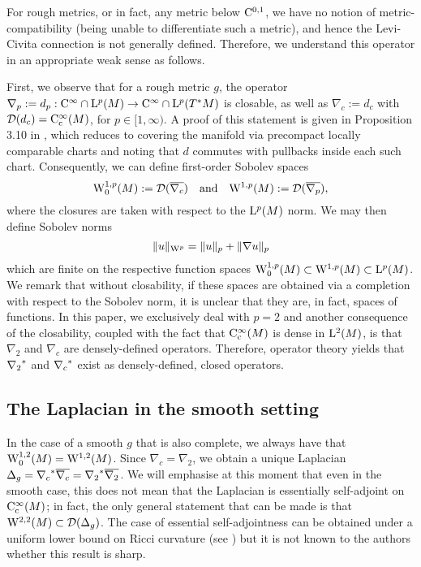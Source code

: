 \documentclass[a4paper, 12pt]{amsart}
\begin{document}
For rough metrics, or in fact, any metric below $\Ck{0,1}$, we have no notion of metric-compatibility (being unable to differentiate such a metric), and hence the Levi-Civita connection is not generally defined. Therefore, we understand this operator in an appropriate weak sense as follows. 

First, we observe that for a rough metric $g$, the operator
$\nabla_p := d_p: \Ck{\infty} \cap \Lp{p}(M) \to \Ck{\infty} \cap \Lp{p}(T^\ast M)$
is closable, as well as $\nabla_c := d_c$ with $\dom(d_c) = \Ck[c]{\infty}(M)$,
for $p \in [1, \infty)$. A proof of this statement is given in Proposition 3.10 in \cite{BRough}, 
which reduces to covering the manifold via precompact locally comparable
charts and noting that $d$ commutes with pullbacks inside each such chart.
Consequently, we can define first-order Sobolev spaces
\[
\Sob[0]{1,p}(M) := \dom(\overline{\nabla_c})\quad \text{and}\quad  \Sob{1,p}(M) := \dom(\overline{\nabla_p}),
\]
where the closures are taken with respect to the \(\Lp{p}(M)\) norm. We may then define Sobolev norms
\[
\|u\|_{\Sob{p}} = \|u\|_p + \|\nabla u\|_p
\]
which are finite on the respective function spaces $\Sob[0]{1,p}(M) \subset \Sob{1,p}(M) \subset \Lp{p}(M)$. We remark that without closability, if these spaces are obtained via a completion with respect to the Sobolev norm, it is unclear that they are, in fact, spaces of functions. In this paper, we exclusively deal with \(p = 2\) and another consequence of the closability, coupled with the 
fact that $\Ck[c]{\infty}(M)$ is dense in $\Lp{2}(M)$,
is that $\nabla_2$ and $\nabla_c$ are densely-defined
operators. Therefore, operator theory yields 
that $\adj{\nabla_2}$ and $\adj{\nabla_c}$ exist
as densely-defined, closed operators.

\subsection{The Laplacian in the smooth setting}

In the case of a smooth $g$ that is also complete, we
always have that $\SobH[0]{1}(M) = \SobH{1}(M)$. 
Since $\nabla_c = \nabla_2$, we obtain 
a unique Laplacian $\Delta_g = \adj{\nabla_c} \close{\nabla_c} = \adj{\nabla_2}\close{\nabla_2}$.
We will emphasise at this moment that even in the smooth case, this does not mean that the Laplacian is essentially self-adjoint on $\Ck[c]{\infty}(M)$; in fact, the only general statement that can be made is that
$\SobH{2}(M) \subset \dom(\Delta_g)$. The 
case of essential self-adjointness can
be obtained under a uniform lower bound on Ricci
curvature (see \cite{BDensity}) but it
is not known to the authors whether this result is sharp.
\end{document}
